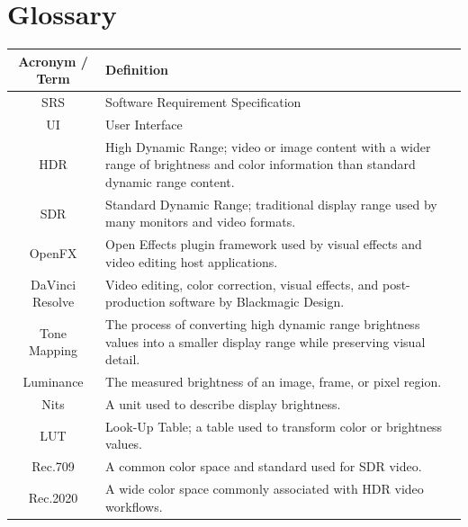 \documentclass[12pt]{article}
\begin{document}

\section*{Glossary}
\begin{table}[H]
\centering
\renewcommand{\arraystretch}{1.4}
\begin{tabular}{|c|p{10cm}|}
\hline
\textbf{Acronym / Term} & \textbf{Definition} \\
\hline
SRS & Software Requirement Specification \\
\hline
UI & User Interface \\
\hline
HDR & High Dynamic Range; video or image content with a wider range of brightness and color information than standard dynamic range content. \\
\hline
SDR & Standard Dynamic Range; traditional display range used by many monitors and video formats. \\
\hline
OpenFX & Open Effects plugin framework used by visual effects and video editing host applications. \\
\hline
DaVinci Resolve & Video editing, color correction, visual effects, and post-production software by Blackmagic Design. \\
\hline
Tone Mapping & The process of converting high dynamic range brightness values into a smaller display range while preserving visual detail. \\
\hline
Luminance & The measured brightness of an image, frame, or pixel region. \\
\hline
Nits & A unit used to describe display brightness. \\
\hline
LUT & Look-Up Table; a table used to transform color or brightness values. \\
\hline
Rec.709 & A common color space and standard used for SDR video. \\
\hline
Rec.2020 & A wide color space commonly associated with HDR video workflows. \\
\hline
\end{tabular}
\end{table}

\end{document}
